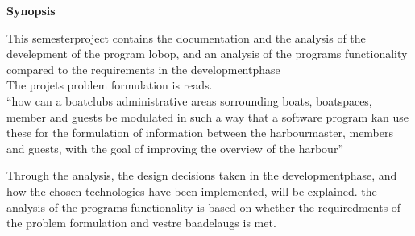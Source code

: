 \begin{center}\textbf{Synopsis}\\ \end{center}

This semesterproject contains the documentation and the analysis of the develepment of the program lobop, and an analysis of the programs functionality compared to the requirements in the developmentphase\\

The projets problem formulation is reads.\\

\enquote{how can a boatclubs administrative areas sorrounding boats, boatspaces, member and guests be modulated in such a way that a software program kan use these for the formulation of information between the harbourmaster, members and guests, with the goal of improving the overview of the harbour}

Through the analysis, the design decisions taken in the developmentphase, and how the chosen technologies have been implemented, will be explained. the analysis of the programs functionality is based on whether the requiredments of the problem formulation and vestre baadelaugs is met.
